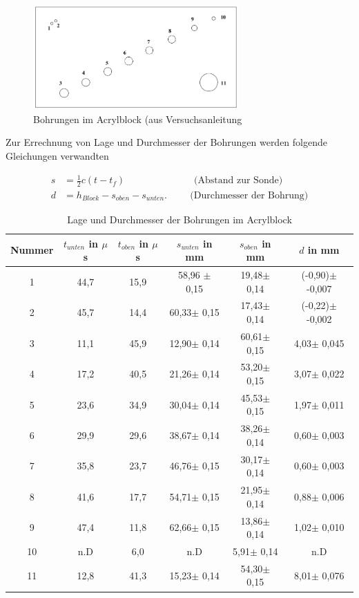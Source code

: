\begin{figure}[H]
\includegraphics[width=0.7\textwidth]{pics/block.png}
\caption{Bohrungen im Acrylblock (aus Versuchsanleitung}
\label{pic_block} 
\end{figure}

Zur Errechnung von Lage und Durchmesser der Bohrungen werden folgende Gleichungen verwandten

\begin{align}
 s &= \frac12 c(t-t_f) \hspace{3cm} \text{(Abstand zur Sonde)}\\
 d &= h_{Block} - s_{oben} - s_{unten}. \hspace{1cm} \text{(Durchmesser der Bohrung)}
\end{align}

\begin{table}[H]
 \begin{tabular}{c|c|c|c|c|c}
 Nummer & $t_{unten}$ in $\mu$s& $t_{oben}$ in $\mu$s& $s_{unten}$ in mm& $s_{oben}$ in mm& $d$ in mm\\
 \hline
 \hline
1 &	44,7&	15,9&	58,96 $\pm$	0,15&	19,48$\pm$	0,14&	(-0,90)$\pm$	-0,007 \\
2&	45,7&	14,4&	60,33$\pm$	0,15&	17,43$\pm$	0,14&	(-0,22)$\pm$	-0,002\\
\hline
3&	11,1&	45,9&	12,90$\pm$	0,14&	60,61$\pm$	0,15&	4,03$\pm$	0,045\\
4&	17,2&	40,5&	21,26$\pm$	0,14&	53,20$\pm$	0,15&	3,07$\pm$	0,022\\
5&	23,6&	34,9&	30,04$\pm$	0,14&	45,53$\pm$	0,15&	1,97$\pm$	0,011\\
6&	29,9&	29,6&	38,67$\pm$	0,14&	38,26$\pm$	0,14&	0,60$\pm$	0,003\\
7&	35,8&	23,7&	46,76$\pm$	0,15&	30,17$\pm$	0,14&	0,60$\pm$	0,003\\
8&	41,6&	17,7&	54,71$\pm$	0,15&	21,95$\pm$	0,14&	0,88$\pm$	0,006\\
9&	47,4&	11,8&	62,66$\pm$	0,15&	13,86$\pm$	0,14&	1,02$\pm$	0,010\\
10&	n.D	&6,0&		n.D		&5,91$\pm$	0,14&	n.D	\\
\hline
11&	12,8&	41,3&	15,23$\pm$	0,14&	54,30$\pm$	0,15&	8,01$\pm$	0,076
 \end{tabular}
 \caption{Lage und Durchmesser der Bohrungen im Acrylblock}
 \label{tab_block}
\end{table}

